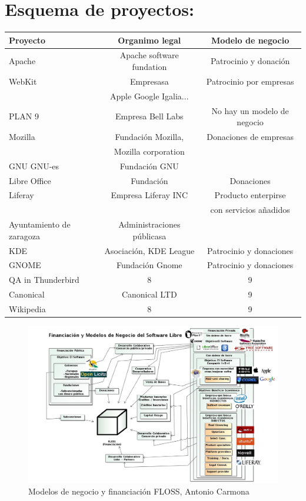 \documentclass[12pt]{article} %
\begin{document}
\section{Esquema de proyectos:}
\begin{tabular}{| l | c | c | }
     \hline
     Proyecto & Organimo legal & Modelo de negocio \\ \hline
     Apache & Apache software fundation & Patrocinio y donación \\ \hline
     WebKit & Empresasa &Patrocinio por empresas \\
     &Apple Google Igalia... & \\ \hline
     PLAN 9 & Empresa Bell Labs & No hay un modelo de negocio \\ \hline
     Mozilla & Fundación Mozilla, & Donaciones de empresas \\
     & Mozilla corporation & \\ \hline
     GNU GNU-es & Fundación GNU &  \\ \hline
     Libre Office & Fundación & Donaciones \\ \hline
     Liferay & Empresa Liferay INC & Producto enterpirse\\&& con servicios añadidos \\ \hline
     Ayuntamiento de zaragoza & Administraciones públicasa &  \\ \hline
     KDE & Asociación, KDE League & Patrocinio y donaciones \\ \hline
     GNOME & Fundación Gnome & Patrocinio y donaciones \\ \hline
     QA in Thunderbird & 8 & 9 \\ \hline
     Canonical & Canonical LTD & 9 \\ \hline
     Wikipedia & 8 & 9 \\ \hline
    
   \end{tabular}

\begin{figure}
  \caption{Modelos de negocio y financiaci\'on FLOSS, Antonio Carmona}
    \centering
\includegraphics[width=\textwidth]{./MSWL-CSII-ModelosNegocioFlossDHernandez-ACarmona.jpg}
\end{figure}
   
\end{document}
